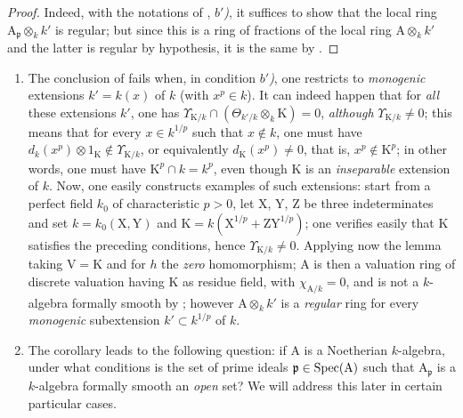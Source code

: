 \begin{proof}
Indeed, with the notations of , \emph{$b'$)}, it suffices to show that the local ring $\mathrm{A}_\mathfrak{p}\otimes_kk'$ is regular; but since this is a ring of fractions of the local ring $\mathrm{A}\otimes_kk'$ and the latter is regular by hypothesis, it is the same by .
\end{proof}

\begin{remarks}[22.5.10]
\label{0.22.5.10}
\begin{enumerate}
  \item[\rm{(i)}] The conclusion of  fails when, in condition \emph{$b'$)}, one restricts to \emph{monogenic} extensions $k'=k(x)$ of $k$ (with $x^p\in k$).
  It can indeed happen that for \emph{all} these extensions $k'$, one has $\Upsilon_{\mathrm{K}/k}\cap(\Theta_{k'/k}\otimes_k\mathrm{K})=0$, \emph{although} $\Upsilon_{\mathrm{K}/k}\neq 0$; this means that for every $x\in k^{1/p}$ such that $x\notin k$, one must have $d_k(x^p)\otimes 1_\mathrm{K}\notin\Upsilon_{\mathrm{K}/k}$, or equivalently $d_\mathrm{K}(x^p)\neq 0$, that is, $x^p\notin\mathrm{K}^p$; in other words, one must have $\mathrm{K}^p\cap k=k^p$, even though $\mathrm{K}$ is an \emph{inseparable} extension of $k$.
  Now, one easily constructs examples of such extensions: start from a perfect field $k_0$ of characteristic $p>0$, let $\mathrm{X}$, $\mathrm{Y}$, $\mathrm{Z}$ be three indeterminates and set $k=k_0(\mathrm{X},\mathrm{Y})$ and $\mathrm{K}=k(\mathrm{X}^{1/p}+\mathrm{Z}\mathrm{Y}^{1/p})$; one verifies easily that $\mathrm{K}$ satisfies the preceding conditions, hence $\Upsilon_{\mathrm{K}/k}\neq 0$.
  Applying now the lemma  taking $\mathrm{V}=\mathrm{K}$ and for $h$ the \emph{zero} homomorphism; $\mathrm{A}$ is then a valuation ring of discrete valuation having $\mathrm{K}$ as residue field, with $\chi_{\mathrm{A}/k}=0$, and is not a $k$-algebra formally smooth by ; however $\mathrm{A}\otimes_kk'$ is a \emph{regular} ring for every \emph{monogenic} subextension $k'\subset k^{1/p}$ of $k$.
  \item[\rm{(ii)}] The corollary  leads to the following question: if $\mathrm{A}$ is a Noetherian $k$-algebra, under what conditions is the set of prime ideals $\mathfrak{p}\in\operatorname{Spec}(\mathrm{A})$ such that $\mathrm{A}_\mathfrak{p}$ is a $k$-algebra formally smooth an \emph{open} set?
  We will address this later in certain particular cases.
\end{enumerate}
\end{remarks}

